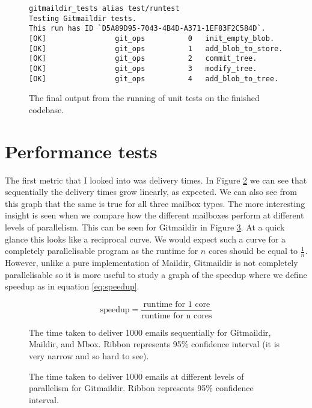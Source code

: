 \begin{figure}[h]
\centering
\begin{Verbatim}
gitmaildir_tests alias test/runtest
Testing Gitmaildir tests.
This run has ID `D5A89D95-7043-4B4D-A371-1EF83F2C584D`.
[OK]                git_ops          0   init_empty_blob.
[OK]                git_ops          1   add_blob_to_store.
[OK]                git_ops          2   commit_tree.
[OK]                git_ops          3   modify_tree.
[OK]                git_ops          4   add_blob_to_tree.
\end{Verbatim}
\caption{The final output from the running of unit tests on the finished codebase.}
\label{fig:unittests}
\end{figure}

\section{Performance tests}

The first metric that I looked into was delivery times. In Figure \ref{fig:tds_combined} we can see that sequentially the delivery times grow linearly, as expected. We can also see from this graph that the same is true for all three mailbox types. The more interesting insight is seen when we compare how the different mailboxes perform at different levels of parallelism. This can be seen for Gitmaildir in Figure \ref{fig:tdpp}. At a quick glance this looks like a reciprocal curve. We would expect such a curve for a completely parallelisable program as the runtime for $n$ cores should be equal to $\frac{1}{n}$. However, unlike a pure implementation of Maildir, Gitmaildir is not completely parallelisable so it is more useful to study a graph of the speedup where we define speedup as in equation \ref{eq:speedup}.

\begin{equation} \label{eq:speedup}
\textrm{speedup} = \frac{\textrm{runtime for 1 core}}{\textrm{runtime for n cores}}
\end{equation}

\begin{figure}[h]
    \centering
    
    \caption{The time taken to deliver 1000 emails sequentially for Gitmaildir, Maildir, and Mbox. Ribbon represents 95\% confidence interval (it is very narrow and so hard to see).}
    \label{fig:tds_combined}
\end{figure}


\begin{figure}[h]
    \centering
    
    \caption{The time taken to deliver 1000 emails at different levels of parallelism for Gitmaildir. Ribbon represents 95\% confidence interval.}
    \label{fig:tdpp}
\end{figure}

